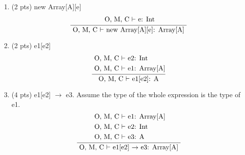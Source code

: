 \documentclass[10pt]{article}
\newcommand{\infertext}[2]{\infer{{\textrm{#2}}}{\begin{aligned}#1\end{aligned}}}
\begin{document}
\begin{enumerate}
\begin{enumerate}
\begin{enumerate}
	\item (2 pts) \textsf{new Array[A][e]}
	\begin{equation}\infertext{
		\textrm{ O, M, C $\vdash$ e: Int}
	} {
		O, M, C $\vdash$ new Array[A][e]: Array[A]
	}\end{equation}
	\item (2 pts) \textsf{e1[e2]}
	\begin{equation}\infertext{
		& \textrm{ O, M, C $\vdash$ e2: Int} \\
		& \textrm{ O, M, C $\vdash$ e1: Array[A]} \\
	} {
		O, M, C $\vdash$ e1[e2]: A
	}\end{equation}
	\item (4 pts) \textsf{e1[e2] $\rightarrow$ e3}. Assume the type of the whole expression is the type of \textsf{e1}.
	\begin{equation}\infertext{
		& \textrm{ O, M, C $\vdash$ e1: Array[A]} \\
		& \textrm{ O, M, C $\vdash$ e2: Int} \\
		& \textrm{ O, M, C $\vdash$ e3: A} \\
	} {
		O, M, C $\vdash$ e1[e2] $\rightarrow$ e3: Array[A]
	}\end{equation}


\end{enumerate}
\end{enumerate}
\end{enumerate}
\end{document}
